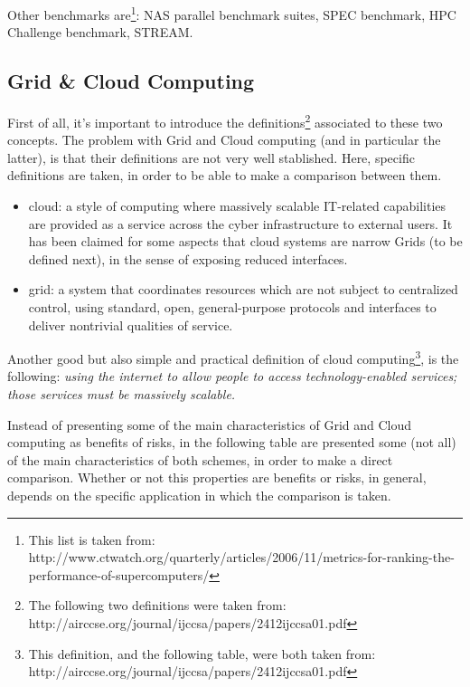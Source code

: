 \documentclass[paper=a4, fontsize=11pt]{scrartcl} %
\numberwithin{equation}{section} %
\numberwithin{figure}{section} %
\numberwithin{table}{section} %
\begin{document}
Other benchmarks are\footnote{This list is taken from: http://www.ctwatch.org/quarterly/articles/2006/11/metrics-for-ranking-the-performance-of-supercomputers/}: NAS parallel benchmark suites, SPEC benchmark, HPC Challenge benchmark, STREAM.




\subsection{\textbf{Grid \& Cloud Computing}}

First of all, it's important to introduce the definitions\footnote{The following two definitions were taken from: http://airccse.org/journal/ijccsa/papers/2412ijccsa01.pdf} associated to these two concepts. The problem with Grid and Cloud computing (and in particular the latter), is that their definitions are not very well stablished. Here, specific definitions are taken, in order to be able to make a comparison between them.

\begin{itemize}
\item cloud: a style of computing where massively scalable IT-related capabilities are provided as a service across the cyber infrastructure to external users. It has been claimed for some aspects that cloud systems are narrow Grids (to be defined next), in the sense of exposing reduced interfaces.
\item grid: a system that coordinates resources which are not subject to centralized control, using standard, open, general-purpose protocols and interfaces to deliver nontrivial qualities of service. 
\end{itemize}

Another good but also simple and practical definition of cloud computing\footnote{This definition, and the following table, were both taken from: http://airccse.org/journal/ijccsa/papers/2412ijccsa01.pdf}, is the following: \textit{using the internet to allow people to access technology-enabled services; those services must be massively scalable.}

Instead of presenting some of the main characteristics of Grid and Cloud computing as benefits of risks, in the following table are presented some (not all) of the main characteristics of both schemes, in order to make a direct comparison. Whether or not this properties are benefits or risks, in general, depends on the specific application in which the comparison is taken.
\end{document}
